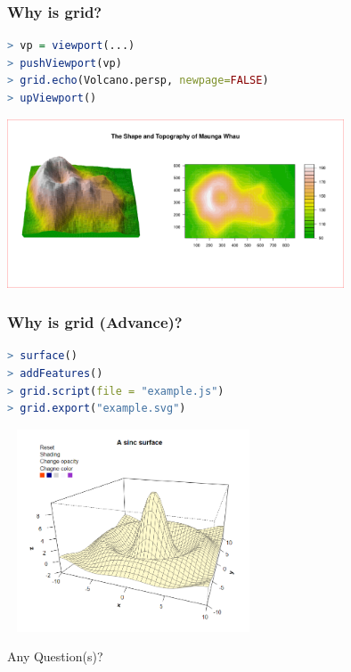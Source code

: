 \documentclass{beamer}
\begin{document}
\begin{frame}[fragile]
\frametitle{Why is \textbf{grid}?}

\begin{lstlisting}[language = R]
> vp = viewport(...)
> pushViewport(vp)
> grid.echo(Volcano.persp, newpage=FALSE)
> upViewport()
\end{lstlisting}

\begin{center}
  \includegraphics[height = 5cm, width = 10cm]{plot/demo_grid_example_3.pdf}
\end{center}

\end{frame}


\begin{frame}[fragile]
\frametitle{Why is \textbf{grid} (Advance)?}

\begin{lstlisting}[language = R]
> surface()
> addFeatures()
> grid.script(file = "example.js")
> grid.export("example.svg")

\end{lstlisting}

\begin{center}
  \includegraphics[height = 6cm, width = 7.5cm]{plot/origin_1.PNG}
\end{center}

\end{frame}


\begin{frame}[fragile]

\begin{center}
\Huge Any Question(s)?
\end{center}


\end{frame}
\end{document}
